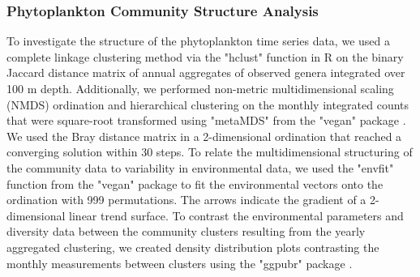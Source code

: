 \documentclass[draft]{agujournal2019}
\begin{document}
    \subsubsection{Phytoplankton Community Structure Analysis}
    To investigate the structure of the phytoplankton time series data, we used a complete linkage clustering method via the "hclust" function in R \cite{r_core_team_r_2024} on the binary Jaccard distance matrix of annual aggregates of observed genera integrated over 100 m depth. Additionally, we performed non-metric multidimensional scaling (NMDS) ordination and hierarchical clustering on the monthly integrated counts that were square-root transformed using "metaMDS" from the "vegan" package \cite{oksanen_vegan_2024}. We used the Bray distance matrix in a 2-dimensional ordination that reached a converging solution within 30 steps. To relate the multidimensional structuring of the community data to variability in environmental data, we used the "envfit" function from the "vegan" package to fit the environmental vectors onto the ordination with 999 permutations. The arrows indicate the gradient of a 2-dimensional linear trend surface. 
    To contrast the environmental parameters and diversity data between the community clusters resulting from the yearly aggregated clustering, we created density distribution plots contrasting the monthly measurements between clusters using the "ggpubr" package \cite{kassambara_ggpubr_2023}. %

        
\end{document}
